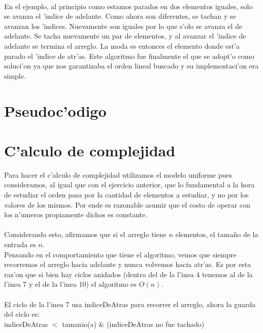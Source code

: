 \paragraph{}
En el ejemplo, al principio como estamos parados en dos elementos iguales, solo se avanza el 'indice de adelante. 
Como ahora son diferentes, se tachan y se avanzan los 'indices. Nuevamente son iguales por lo que s'olo 
se avanza el de adelante. Se tacha nuevamente un par de elementos, y al avanzar el 'indice de adelante se 
termina el arreglo. La moda es entonces el elemento donde est'a parado el 'indice de atr'as.
Este algoritmo fue finalmente el que se adopt'o como soluci'on ya que nos garantizaba el orden lineal 
buscado y su implementaci'on era simple.

\section{Pseudoc'odigo}


\newpage
\section{C'alculo de complejidad}
Para hacer el c'alculo de complejidad utilizamos el modelo uniforme pues consideramos, al igual que con 
el ejercicio anterior, que lo fundamental a la hora de estudiar el orden pasa por la cantidad de elementos 
a estudiar, y no por los valores de los mismos. Por ende es razonable asumir que el costo de operar
con los n'umeros propiamente dichos es constante.
\paragraph{}
Considerando esto, afirmamos que si el arreglo tiene $n$ elementos, el tama\~{n}o de la entrada es $n$.\\
Pensando en el comportamiento que tiene el algoritmo, vemos que siempre recorremos el arreglo hacia adelante 
y nunca volvemos hacia atr'as. Es por esta raz'on que si bien hay ciclos anidados (dentro del de la l'inea 
4 tenemos al de la l'inea 7 y el de la l'inea 10) el algoritmo es $O(n)$.
\paragraph{}
El ciclo de la l'inea 7 usa indiceDeAtras para recorrer el arreglo, ahora la guarda del ciclo es:\\

indiceDeAtras $<$ tamanio(a) $\&$ (indiceDeAtras no fue tachado)\

